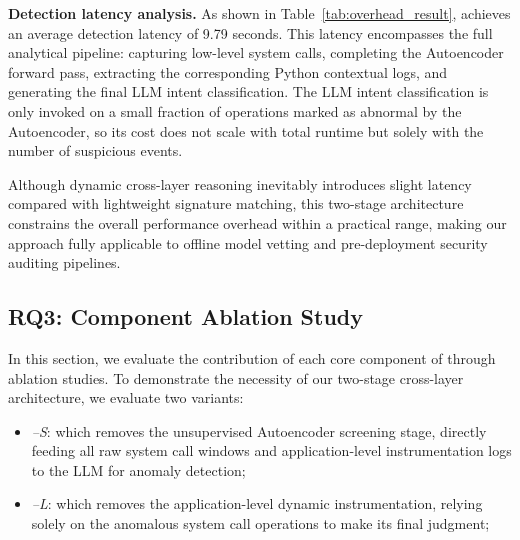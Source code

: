 \noindent \textbf{Detection latency analysis.} As shown in Table~\ref{tab:overhead_result}, \toolname{} achieves an average detection latency of 9.79 seconds. This latency encompasses the full analytical pipeline: capturing low-level system calls, completing the Autoencoder forward pass, extracting the corresponding Python contextual logs, and generating the final LLM intent classification. The LLM intent classification is only invoked on a small fraction of operations marked as abnormal by the Autoencoder, so its cost does not scale with total runtime but solely with the number of suspicious events.

Although dynamic cross-layer reasoning inevitably introduces slight latency compared with lightweight signature matching, this two-stage architecture constrains the overall performance overhead within a practical range, making our approach fully applicable to offline model vetting and pre-deployment security auditing pipelines.

\label{sec:rq3}

\subsection{RQ3: Component Ablation Study}
In this section, we evaluate the contribution of each core component of \toolname{} through ablation studies. To demonstrate the necessity of our two-stage cross-layer architecture, we evaluate two variants:

\begin{itemize}
    \item \emph{\toolname{}--S}: which removes the unsupervised Autoencoder screening stage, directly feeding all raw system call windows and application-level instrumentation logs to the LLM for anomaly detection;
    \item \emph{\toolname{}--L}: which removes the application-level dynamic instrumentation, relying solely on the anomalous system call operations to make its final judgment;
\end{itemize}

